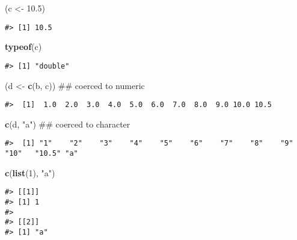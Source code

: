 \documentclass[]{book}
\newenvironment{Shaded}{\begin{snugshade}}{\end{snugshade}}
\newcommand{\KeywordTok}[1]{\textcolor[rgb]{0.13,0.29,0.53}{\textbf{#1}}}
\newcommand{\DecValTok}[1]{\textcolor[rgb]{0.00,0.00,0.81}{#1}}
\newcommand{\FloatTok}[1]{\textcolor[rgb]{0.00,0.00,0.81}{#1}}
\newcommand{\StringTok}[1]{\textcolor[rgb]{0.31,0.60,0.02}{#1}}
\newcommand{\NormalTok}[1]{#1}
\theoremstyle{definition}
\theoremstyle{definition}
\theoremstyle{definition}
\theoremstyle{remark}
\begin{document}
\begin{Shaded}
\begin{Highlighting}[]
\NormalTok{(c <-}\StringTok{ }\FloatTok{10.5}\NormalTok{)}
\end{Highlighting}
\end{Shaded}

\begin{verbatim}
#> [1] 10.5
\end{verbatim}

\begin{Shaded}
\begin{Highlighting}[]
\KeywordTok{typeof}\NormalTok{(c)}
\end{Highlighting}
\end{Shaded}

\begin{verbatim}
#> [1] "double"
\end{verbatim}

\begin{Shaded}
\begin{Highlighting}[]
\NormalTok{(d <-}\StringTok{ }\KeywordTok{c}\NormalTok{(b, c))  ## coerced to numeric}
\end{Highlighting}
\end{Shaded}

\begin{verbatim}
#>  [1]  1.0  2.0  3.0  4.0  5.0  6.0  7.0  8.0  9.0 10.0 10.5
\end{verbatim}

\begin{Shaded}
\begin{Highlighting}[]
\KeywordTok{c}\NormalTok{(d, }\StringTok{"a"}\NormalTok{)  ## coerced to character}
\end{Highlighting}
\end{Shaded}

\begin{verbatim}
#>  [1] "1"    "2"    "3"    "4"    "5"    "6"    "7"    "8"    "9"    "10"   "10.5" "a"
\end{verbatim}

\begin{Shaded}
\begin{Highlighting}[]
\KeywordTok{c}\NormalTok{(}\KeywordTok{list}\NormalTok{(}\DecValTok{1}\NormalTok{), }\StringTok{"a"}\NormalTok{)}
\end{Highlighting}
\end{Shaded}

\begin{verbatim}
#> [[1]]
#> [1] 1
#> 
#> [[2]]
#> [1] "a"
\end{verbatim}
\end{document}

